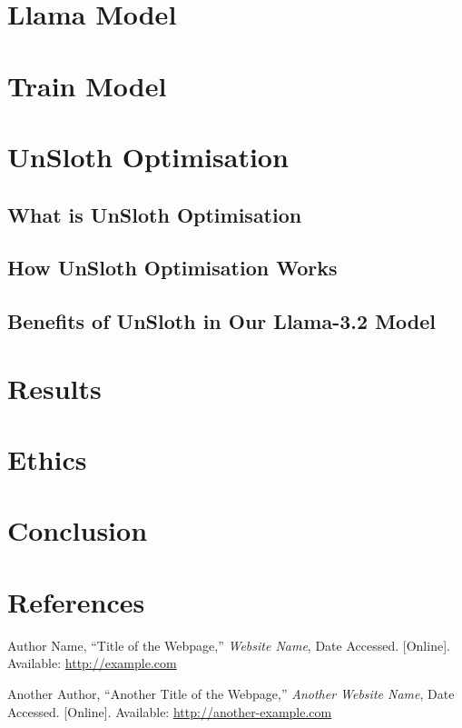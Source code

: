 \documentclass{article}
\begin{document}
\section{Llama Model}

\section{Train Model}

\section{UnSloth Optimisation}

\subsection{What is UnSloth Optimisation}

\subsection{How UnSloth Optimisation Works}

\subsection{Benefits of UnSloth in Our Llama-3.2 Model}

\section{Results}

\section{Ethics}

\section{Conclusion}

\section{References}
\begin{thebibliography}{9}

Author Name, ``Title of the Webpage,'' \textit{Website Name}, Date Accessed. [Online]. Available: \url{http://example.com}

Another Author, ``Another Title of the Webpage,'' \textit{Another Website Name}, Date Accessed. [Online]. Available: \url{http://another-example.com}

\end{thebibliography}
\end{document}
